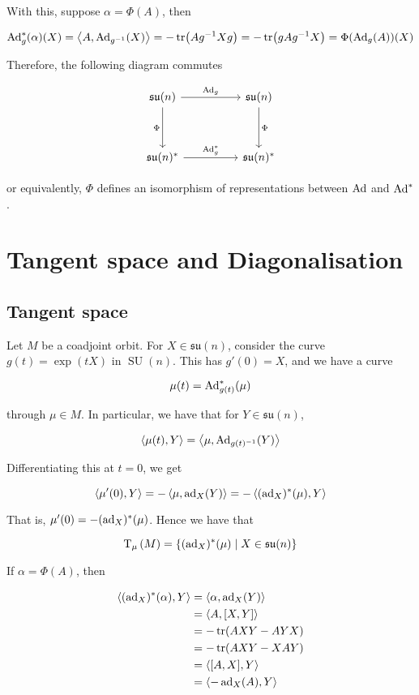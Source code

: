\documentclass{article}
\DeclareMathOperator{\SU}{SU}
\newcommand{\su}{\mathfrak{su}}
\begin{document}
With this, suppose \(\alpha = \Phi(A)\), then

\[\operatorname{Ad}_g^*(\alpha)(X) = \left\langle A, \operatorname{Ad}_{g^{-1}}(X) \right\rangle = -\tr(Ag^{-1}Xg) = -\tr(gAg^{-1}X) = \Phi(\operatorname{Ad}_g(A))(X)\]

Therefore, the following diagram commutes

\[\begin{tikzcd}
	{\su(n)} && {\su(n)} \\
	\\
	{\su(n)^*} && {\su(n)^*}
	\arrow["{\Ad_g^*}", from=3-1, to=3-3]
	\arrow["{\Ad_g}", from=1-1, to=1-3]
	\arrow["\Phi"', from=1-1, to=3-1]
	\arrow["\Phi", from=1-3, to=3-3]
\end{tikzcd}\]

or equivalently, \(\Phi\) defines an isomorphism of representations between \(\operatorname{Ad}\) and \(\operatorname{Ad}^*\).

\section{Tangent space and Diagonalisation}

\subsection{Tangent space}

Let \( M\) be a coadjoint orbit. For \(X \in \su(n)\), consider the curve \(g(t) = \exp(tX)\) in \(\SU(n)\). This has \(g'(0) = X\), and we have a curve

\[\mu(t) = \operatorname{Ad}_{g(t)}^*(\mu)\]

through \(\mu \in  M\). In particular, we have that for \(Y \in \su(n)\),

\[\left\langle \mu(t), Y \right\rangle = \left\langle \mu, \operatorname{Ad}_{g(t)^{-1}}(Y) \right\rangle\]

Differentiating this at \(t = 0\), we get

\[\left\langle \mu'(0), Y \right\rangle = -\left\langle \mu, \operatorname{ad}_X(Y) \right\rangle = -\left\langle (\operatorname{ad}_X)^*(\mu), Y \right\rangle\]

That is, \(\mu'(0) = -(\operatorname{ad}_X)^*(\mu)\). Hence we have that

\[\T_\mu\left( M\right) = \left\{(\ad_X)^*(\mu) \mid X \in \su(n)\right\}\]

If \(\alpha= \Phi(A)\), then

\begin{align*}
    \left\langle (\operatorname{ad}_X)^*(\alpha), Y \right\rangle &= \left\langle \alpha, \operatorname{ad}_X(Y) \right\rangle \\
    &= \left\langle A, [X, Y] \right\rangle \\
    &= -\tr(AXY - AYX) \\
    &= -\tr(AXY - XAY) \\
    &= \left\langle [A, X], Y \right\rangle \\
    &= \left\langle -\operatorname{ad}_X(A), Y \right\rangle
\end{align*}
\end{document}
